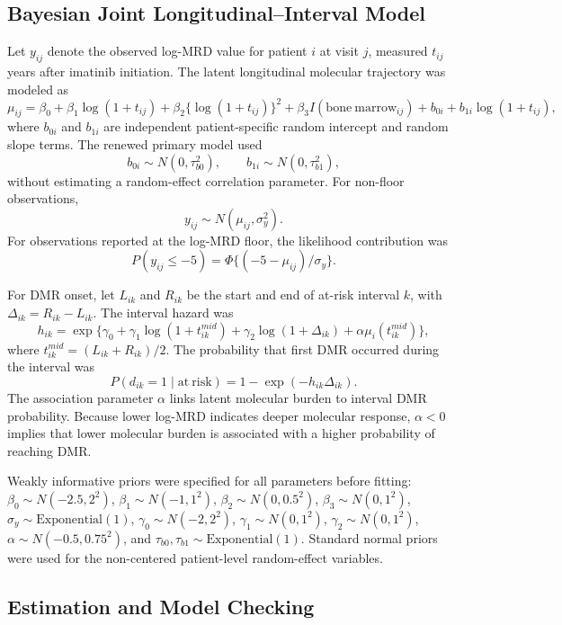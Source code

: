 \documentclass[11pt]{article}
\begin{document}
\subsection{Bayesian Joint Longitudinal--Interval Model}

Let \(y_{ij}\) denote the observed log-MRD value for patient \(i\) at visit \(j\), measured \(t_{ij}\) years after imatinib initiation. The latent longitudinal molecular trajectory was modeled as
\[
\mu_{ij} =
\beta_0 + \beta_1 \log(1+t_{ij}) + \beta_2\{\log(1+t_{ij})\}^2
+ \beta_3 I(\mathrm{bone\ marrow}_{ij}) + b_{0i} + b_{1i}\log(1+t_{ij}),
\]
where \(b_{0i}\) and \(b_{1i}\) are independent patient-specific random intercept and random slope terms. The renewed primary model used
\[
b_{0i}\sim N(0,\tau_{b0}^2), \qquad
b_{1i}\sim N(0,\tau_{b1}^2),
\]
without estimating a random-effect correlation parameter. For non-floor observations,
\[
y_{ij}\sim N(\mu_{ij}, \sigma_y^2).
\]
For observations reported at the log-MRD floor, the likelihood contribution was
\[
P(y_{ij}\leq -5)=\Phi\{(-5-\mu_{ij})/\sigma_y\}.
\]

For DMR onset, let \(L_{ik}\) and \(R_{ik}\) be the start and end of at-risk interval \(k\), with \(\Delta_{ik}=R_{ik}-L_{ik}\). The interval hazard was
\[
h_{ik} =
\exp\{\gamma_0 + \gamma_1\log(1+t_{ik}^{mid})
+\gamma_2\log(1+\Delta_{ik})+\alpha\mu_i(t_{ik}^{mid})\},
\]
where \(t_{ik}^{mid}=(L_{ik}+R_{ik})/2\). The probability that first DMR occurred during the interval was
\[
P(d_{ik}=1 \mid \mathrm{at\ risk})=1-\exp(-h_{ik}\Delta_{ik}).
\]
The association parameter \(\alpha\) links latent molecular burden to interval DMR probability. Because lower log-MRD indicates deeper molecular response, \(\alpha<0\) implies that lower molecular burden is associated with a higher probability of reaching DMR.

Weakly informative priors were specified for all parameters before fitting: \(\beta_0\sim N(-2.5,2^2)\), \(\beta_1\sim N(-1,1^2)\), \(\beta_2\sim N(0,0.5^2)\), \(\beta_3\sim N(0,1^2)\), \(\sigma_y\sim \mathrm{Exponential}(1)\), \(\gamma_0\sim N(-2,2^2)\), \(\gamma_1\sim N(0,1^2)\), \(\gamma_2\sim N(0,1^2)\), \(\alpha\sim N(-0.5,0.75^2)\), and \(\tau_{b0},\tau_{b1}\sim \mathrm{Exponential}(1)\). Standard normal priors were used for the non-centered patient-level random-effect variables.

\subsection{Estimation and Model Checking}
\end{document}
